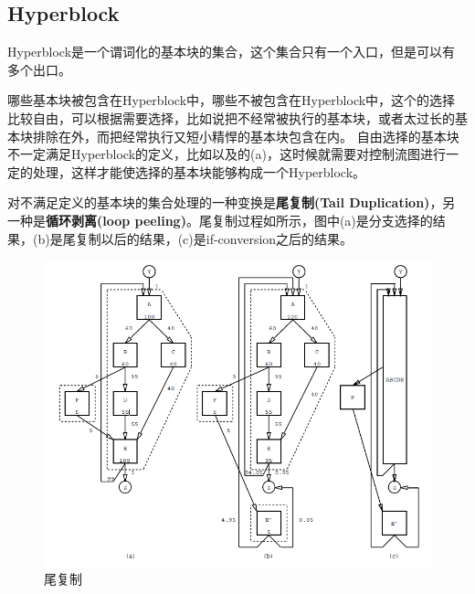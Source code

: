 \subsection{Hyperblock}

\begin{definition}[Hyperblock]
Hyperblock是一个谓词化的基本块的集合，这个集合只有一个入口，但是可以有多个出口。
\end{definition}

哪些基本块被包含在Hyperblock中，哪些不被包含在Hyperblock中，这个的选择比较自由，可以根据需要选择，比如说把不经常被执行的基本块，或者太过长的基本块排除在外，而把经常执行又短小精悍的基本块包含在内。
自由选择的基本块不一定满足Hyperblock的定义，比如以及的(a)，这时候就需要对控制流图进行一定的处理，这样才能使选择的基本块能够构成一个Hyperblock。

对不满足定义的基本块的集合处理的一种变换是\textbf{尾复制(Tail Duplication)}，另一种是\textbf{循环剥离(loop peeling)}。尾复制过程如所示，图中(a)是分支选择的结果，(b)是尾复制以后的结果，(c)是if-conversion之后的结果。
\begin{figure}
\includegraphics[width=\linewidth]{hyperblock-td}
\caption{\label{fig:taildup} 尾复制}
\end{figure}

